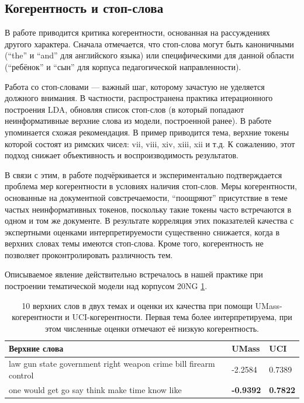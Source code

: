 

\subsection{Когерентность и стоп-слова}

В работе \cite{fan2019assessing} приводится критика когерентности, основанная на рассуждениях другого характера. Сначала отмечается, что стоп-слова могут быть каноничными (``the'' и ``and'' для английского языка) или специфическими для данной области (``ребёнок'' и ``сын'' для корпуса педагогической направленности). 

Работа со стоп-словами --- важный шаг, которому зачастую не уделяется должного внимания. В частности, распространена практика итерационного построения LDA, обновляя список стоп-слов (в который попадают неинформативные верхние слова из модели, построенной ранее). В работе \cite{boydcare} упоминается схожая рекомендация. В пример приводится тема, верхние токены которой состоят из римских чисел: vii, viii, xiv, xiii, xii и т.д. К сожалению, этот подход снижает объективность и воспроизводимость результатов.

В связи с этим, в работе \cite{fan2019assessing} подчёркивается и экспериментально подтверждается проблема мер когерентности в условиях наличия стоп-слов. Меры когерентности, основанные на документной совстречаемости, ``поощряют'' присутствие в теме частых неинформативных токенов, поскольку такие токены часто встречаются в одном и том же документе. В результате корреляция
этих показателей качества с экспертными оценками интерпретируемости существенно снижается, когда в верхних словах темы имеются стоп-слова. Кроме того, когерентность не позволяет проконтролировать различность тем.

Описываемое явление действительно встречалось в нашей практике при построении тематической модели над корпусом 20NG \ref{fig:law_gun_would}.

\begin{table}[t]
    \caption{10 верхних слов в двух темах и оценки их качества при помощи UMass-когерентности и UCI-когерентности. Первая тема более интерпретируема, при этом численные оценки отмечают её низкую когерентность.}
    \label{fig:law_gun_would}
    \small
    \begin{tabular}{ | p{7.5cm}| p{3.5cm} |p{3.5cm} |}
    \hline
    Верхние слова &  UMass & UCI
    \\ \hline	
law gun state government right weapon crime bill firearm control &
-2.2584 & 0.7389
    \\ \hline
one would get go say think make time know like & \textbf{-0.9392} & \textbf{0.7822}
    \\ \hline
    \end{tabular}
\end{table}

